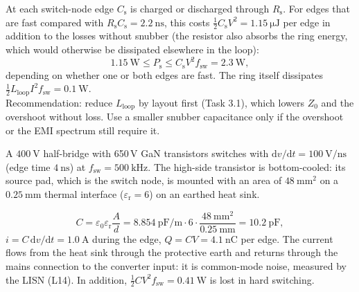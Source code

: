 
\begin{solutionblock}
	At each switch-node edge $C_\mathrm{s}$ is charged or discharged through $R_\mathrm{s}$. For edges that are fast compared with $R_\mathrm{s}C_\mathrm{s}=\SI{2.2}{\nano\second}$, this costs $\frac12C_\mathrm{s}V^2=\SI{1.15}{\micro\joule}$ per edge in addition to the losses without snubber (the resistor also absorbs the ring energy, which would otherwise be dissipated elsewhere in the loop):
	\begin{equation}
		\SI{1.15}{\watt}\leq P_\mathrm{s}\leq C_\mathrm{s}V^2f_\mathrm{sw}=\SI{2.3}{\watt},
	\end{equation}
	depending on whether one or both edges are fast. The ring itself dissipates $\frac12L_\mathrm{loop}I^2f_\mathrm{sw}=\SI{0.1}{\watt}$.\\
	Recommendation: reduce $L_\mathrm{loop}$ by layout first (Task 3.1), which lowers $Z_0$ and the overshoot without loss. Use a smaller snubber capacitance only if the overshoot or the EMI spectrum still require it.
\end{solutionblock}



A $\SI{400}{\volt}$ half-bridge with 650\,V GaN transistors switches with $\mathrm{d}v/\mathrm{d}t=\SI{100}{\volt\per\nano\second}$ (edge time $\SI{4}{\nano\second}$) at $f_\mathrm{sw}=\SI{500}{\kilo\hertz}$. The high-side transistor is bottom-cooled: its source pad, which is the switch node, is mounted with an area of $\SI{48}{\milli\metre\squared}$ on a $\SI{0.25}{\milli\metre}$ thermal interface ($\varepsilon_\mathrm{r}=6$) on an earthed heat sink.


\begin{solutionblock}
	\begin{equation}
		C=\varepsilon_0\varepsilon_\mathrm{r}\frac{A}{d}=\SI{8.854}{\pico\farad\per\metre}\cdot6\cdot\frac{\SI{48}{\milli\metre\squared}}{\SI{0.25}{\milli\metre}}=\SI{10.2}{\pico\farad},
	\end{equation}
	$i=C\,\mathrm{d}v/\mathrm{d}t=\SI{1.0}{\ampere}$ during the edge, $Q=CV=\SI{4.1}{\nano\coulomb}$ per edge. The current flows from the heat sink through the protective earth and returns through the mains connection to the converter input: it is common-mode noise, measured by the LISN (L14). In addition, $\frac12CV^2f_\mathrm{sw}=\SI{0.41}{\watt}$ is lost in hard switching.
\end{solutionblock}

